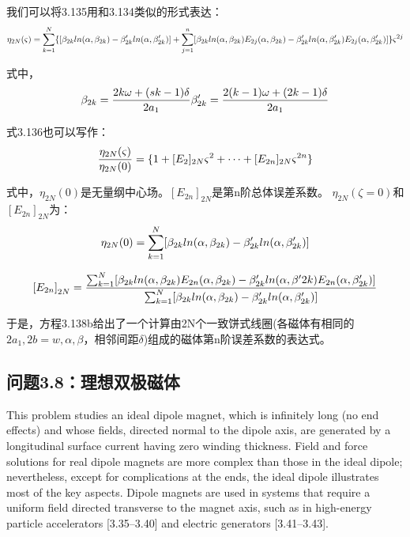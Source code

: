 我们可以将3.135用和3.134类似的形式表达：
$$
\eta_{2N}(\varsigma)=\sum_{k=1}^{N}\{[\beta_{2k}ln(\alpha,\beta_{2k})-\beta'_{2k}ln(\alpha,\beta'_{2k})]\\
+\sum_{j=1}^{n}[\beta_{2k}ln(\alpha,\beta_{2k})E_{2j}(\alpha,\beta_{2k})-\beta'_{2k}ln(\alpha,\beta'_{2k})E_{2j}(\alpha,\beta'_{2k})]\}\varsigma^{2j}\\%
$$

式中，
$$
\beta_{2k}=\frac{2k\omega+(sk-1)\delta}{2a_1}\\ \beta'_{2k}=\frac{2(k-1)\omega+(2k-1)\delta}{2a_{1}}\\
$$

式3.136也可以写作：
\begin{equation}
\frac{\eta_{2N}(\varsigma)}{\eta_{2N}(0)}=\{1+[E_{2}]_{2N}\varsigma^2+\cdots+[E_{2n}]_{2N}\varsigma^{2n}\}\\%
\end{equation}

式中，$\eta_{2N}(0)$是无量纲中心场。$[E_{2n}]_{2N}$是第n阶总体误差系数。
$\eta_{2N}(\zeta=0)$和$[E_{2n}]_{2N}$为：
$$
\eta_{2N}(0)=\sum_{k=1}^{N}[\beta_{2k}ln(\alpha,\beta_{2k})-\beta'_{2k}ln(\alpha,\beta'_{2k})]\\%
$$

$$
{[E_{2n}]}_{2N}=\frac{\sum_{k=1}^{N}[\beta_{2k}ln(\alpha,\beta_{2k})E_{2n}(\alpha,\beta_{2k})-\beta'_{2k}ln(\alpha,\beta'{2k})E_{2n}(\alpha,\beta'_{2k})]}{\sum_{k=1}^{N}[\beta_{2k}ln(\alpha,\beta_{2k})-\beta'_{2k}ln(\alpha,\beta'_{2k})]}\\%
$$

于是，方程3.138b给出了一个计算由2N个一致饼式线圈(各磁体有相同的$2a_1,2b=w,\alpha,\beta$，相邻间距$\delta$)组成的磁体第n阶误差系数的表达式。
\newpage


\subsection{问题3.8：理想双极磁体}

This problem studies an ideal dipole magnet, which is infinitely long (no end effects) and whose fields, directed normal to the dipole axis, are generated by a
longitudinal surface current having zero winding thickness. Field and force solutions for real dipole magnets are more complex than those in the ideal dipole;
nevertheless, except for complications at the ends, the ideal dipole illustrates most
of the key aspects. Dipole magnets are used in systems that require a uniform
field directed transverse to the magnet axis, such as in high-energy particle accelerators [3.35–3.40] and electric generators [3.41–3.43].

